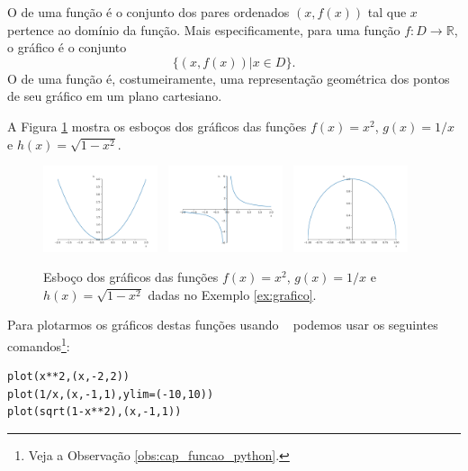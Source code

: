 O  de uma função é o conjunto dos pares ordenados $(x, f(x))$ tal que $x$ pertence ao domínio da função. Mais especificamente, para uma função $f:D\to \mathbb{R}$, o gráfico é o conjunto
\begin{equation}
  \{(x, f(x))| x\in D\}.
\end{equation}
O  de uma função é, costumeiramente, uma representação geométrica dos pontos de seu gráfico em um plano cartesiano.

\begin{ex}\label{ex:grafico}
  A Figura \ref{fig:ex_grafico} mostra os esboços dos gráficos das funções $f(x)=x^2$, $g(x)=1/x$ e $h(x)=\sqrt{1-x^2}$.
  
  \begin{figure}[H]
    \centering
    \includegraphics[width=0.3\textwidth]{./cap_funcao/dados/fig_ex_grafico/fig_ex_grafico_x2}~
    \includegraphics[width=0.3\textwidth]{./cap_funcao/dados/fig_ex_grafico/fig_ex_grafico_1x}~
    \includegraphics[width=0.3\textwidth]{./cap_funcao/dados/fig_ex_grafico/fig_ex_grafico_s1x2}
    \caption{Esboço dos gráficos das funções $f(x)=x^2$, $g(x)=1/x$ e $h(x)=\sqrt{1-x^2}$ dadas no Exemplo \ref{ex:grafico}.}
    \label{fig:ex_grafico}
  \end{figure}

  \ifispython
  Para plotarmos os gráficos destas funções usando \sympy~ podemos usar os seguintes comandos\footnote{Veja a Observação \ref{obs:cap_funcao_python}.}:
\begin{verbatim}
plot(x**2,(x,-2,2))
plot(1/x,(x,-1,1),ylim=(-10,10))
plot(sqrt(1-x**2),(x,-1,1))
\end{verbatim}
  \fi
\end{ex}

